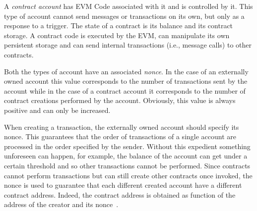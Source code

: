 A \emph{contract account} has EVM Code associated with it and is controlled by
it. This type of account cannot send messages or transactions on its own, but
only as a response to a trigger. The state of a contract is its balance and its
contract storage. A contract code is executed by the EVM, can manipulate its own
persistent storage and can send internal transactions (i.e., message calls) to
other contracts.

Both the types of account have an associated \emph{nonce}. In the case of an
externally owned account this value corresponds to the number of transactions
sent by the account while in the case of a contract account it corresponds to
the number of contract creations performed by the account. Obviously, this value
is always positive and can only be increased.

When creating a transaction, the externally owned account should specify its
nonce. This guarantees that the order of transactions of a single account are
processed in the order specified by the sender. Without this expedient something
unforeseen can happen, for example, the balance of the account can get under a
certain threshold and so other transactions cannot be performed. Since contracts
cannot perform transactions but can still create other contracts once invoked,
the nonce is used to guarantee that each different created account have a
different contract address. Indeed, the contract address is obtained as function
of the address of the creator and its nonce~\cite{wood2018ethereum}.
